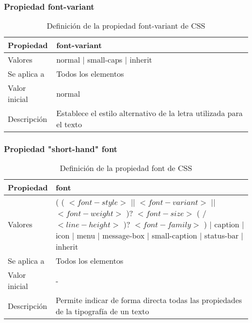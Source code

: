 \begin{frame}
\frametitle{Propiedad font-variant}

\begin{center}
  \begin{table}
   \begin{tabular}{p{1.8cm}p{7.8cm}}
Propiedad & \bf{font-variant} \\ \hline
Valores& normal | small-caps | inherit \\ \hline
Se aplica a& Todos los elementos \\ \hline
Valor inicial& normal \\ \hline
Descripción& Establece el estilo alternativo de la letra utilizada para el texto \\ \hline
  \end{tabular}
   \caption{Definición de la propiedad font-variant de CSS}
 \end{table}
\end{center}


\end{frame}



\begin{frame}
\frametitle{Propiedad "short-hand" font}

\begin{center}
  \begin{table}
   \begin{tabular}{p{1.8cm}p{7.8cm}}
Propiedad & \bf{font} \\ \hline
Valores& ( ( $<font-style>$ || $<font-variant>$ || $<font-weight>$ )? $<font-size>$ ( / $<line-height>$ )? $<font-family>$ ) | caption | icon | menu | message-box | small-caption | status-bar | inherit \\ \hline
Se aplica a& Todos los elementos \\ \hline
Valor inicial& - \\ \hline
Descripción& Permite indicar de forma directa todas las propiedades de la tipografía de un texto \\ \hline
  \end{tabular}
   \caption{Definición de la propiedad font de CSS}
 \end{table}
\end{center}


\end{frame}



